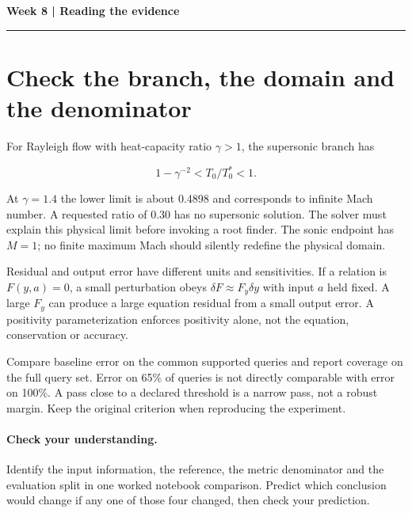 \documentclass[11pt]{article}
\begin{document}
\noindent\textbf{Week 8 | Reading the evidence}\par\medskip\hrule\medskip
\section*{Check the branch, the domain and the denominator}
For Rayleigh flow with heat-capacity ratio $\gamma>1$, the supersonic branch has

\[1-\gamma^{-2}<T_0/T_0^*<1.\]

At $\gamma=1.4$ the lower limit is about 0.4898 and corresponds to infinite
Mach number. A requested ratio of 0.30 has no supersonic solution. The solver
must explain this physical limit before invoking a root finder. The sonic endpoint
has $M=1$; no finite maximum Mach should silently redefine the physical domain.

Residual and output error have different units and sensitivities. If a relation
is $F(y,a)=0$, a small perturbation obeys $\delta F\approx F_y\delta y$ with
input $a$ held fixed. A large $F_y$ can produce a large equation residual from a
small output error. A positivity parameterization enforces positivity alone,
not the equation, conservation or accuracy.

Compare baseline error on the common supported queries and report coverage on
the full query set. Error on 65\% of queries is not directly comparable with
error on 100\%. A pass close to a declared threshold is a narrow pass, not a
robust margin. Keep the original criterion when reproducing the experiment.
\paragraph{Check your understanding.}
Identify the input information, the reference, the metric denominator and the
evaluation split in one worked notebook comparison. Predict which conclusion
would change if any one of those four changed, then check your prediction.
\end{document}
